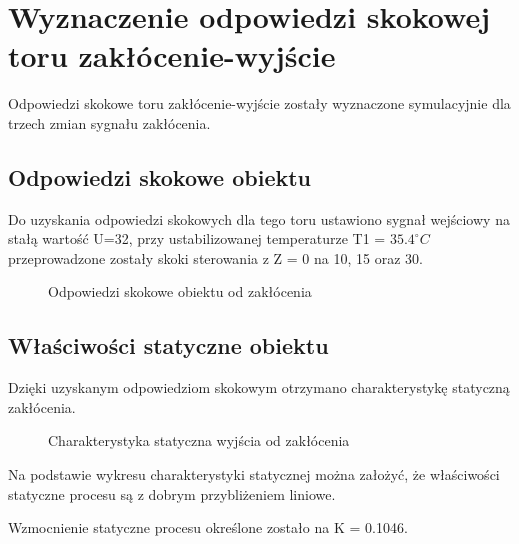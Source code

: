 \section{Wyznaczenie odpowiedzi skokowej toru zakłócenie-wyjście}
\label{lab:zad2}
Odpowiedzi skokowe toru zakłócenie-wyjście zostały wyznaczone symulacyjnie dla trzech
zmian sygnału zakłócenia.
\subsection{Odpowiedzi skokowe obiektu}
\label{lab:zad2:odpSkok}

Do uzyskania odpowiedzi skokowych dla tego toru ustawiono sygnał wejściowy na stałą
wartość U=\num{32}, 
przy ustabilizowanej temperaturze T1 = $\num{35.4}^{\circ} C$ przeprowadzone zostały
skoki sterowania z Z = \num{0} na \num{10}, \num{15} oraz \num{30}.

\begin{figure}[H] 
    \centering
    
    \caption{Odpowiedzi skokowe obiektu od zakłócenia}
    \label{lab:zad2:odpSkok:figure}
\end{figure}

\newpage

\subsection{Właściwości statyczne obiektu}
\label{lab:zad2:charStat}

Dzięki uzyskanym odpowiedziom skokowym otrzymano charakterystykę statyczną
zakłócenia.

\begin{figure}[H] 
    \centering
    
    \caption{Charakterystyka statyczna wyjścia od zakłócenia}
    \label{lab:zad2:charStat:figure}
\end{figure}

Na podstawie wykresu charakterystyki statycznej można założyć, 
że właściwości statyczne procesu są z dobrym przybliżeniem liniowe. 

Wzmocnienie statyczne procesu określone zostało na K = \num{0,1046}.

\newpage
